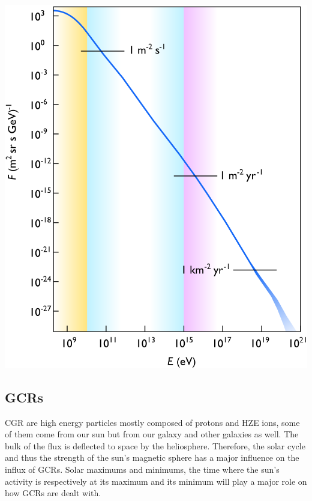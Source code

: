 \documentclass[12pt,a4paper]{report}
\begin{document}
\begin{minipage}[b]{0.5\linewidth}
\centering
\includegraphics[width=1\textwidth]{img/Cosmic_ray_flux_versus_particle_energy.svg.png}
\end{minipage}
\hfill
\begin{minipage}[b]{0.35\linewidth}
\subsection{GCRs}
CGR are high energy particles mostly composed of protons and HZE ions, some of them come from our sun but from our galaxy and other galaxies as well. The bulk of the flux is deflected to space by the heliosphere. Therefore, the solar cycle and thus the strength of the sun's magnetic sphere has a major influence on the influx of GCRs.
Solar maximums and minimums, the time where the sun's activity is respectively at its maximum and its minimum will play a major role on how GCRs are dealt with.
\end{minipage}
\end{document}

